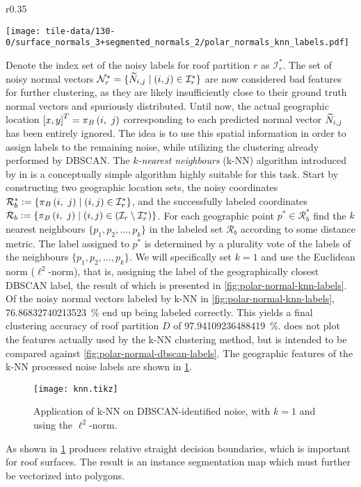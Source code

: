 \begin{wrapfigure}[16]{r}{0.35\textwidth}
  \begin{center}
    \texttt{[image: tile-data/130-0/surface\_normals\_3+segmented\_normals\_2/polar\_normals\_knn\_labels.pdf]}
  \end{center}
  \label{fig:polar-normal-knn-labels}
\end{wrapfigure}
Denote the index set of the noisy labels for roof partition $r$ as $\mathcal{I}_r^*$.
The set of noisy normal vectors $\mathcal{N}_r^* = \{\widetilde{N}_{i,j} \mid (i, j) \in \mathcal{I}_r^*\}$ are now considered bad features for further clustering, as they are likely insufficiently close to their ground truth normal vectors and spuriously distributed.
Until now, the actual geographic location ${[x, y]}^T = \pi_{B}\left(i,~j\right)$ corresponding to each predicted normal vector $\widetilde{N}_{i,j}$ has been entirely ignored.
The idea is to use this spatial information in order to assign labels to the remaining noise, while utilizing the clustering already performed by DBSCAN.
The \textit{$k$-nearest neighbours} (k-NN) algorithm introduced by \citeauthor{knn} in \citeyear{knn} \cite{knn} is a conceptually simple algorithm highly suitable for this task.
Start by constructing two geographic location sets, the noisy coordinates $\mathcal{R}_b^* \vcentcolon= \{\pi_{B}\left(i,~j\right) \mid (i, j) \in \mathcal{I}_r^* \}$, and the successfully labeled coordinates $\mathcal{R}_b \vcentcolon= \{\pi_{B}\left(i,~j\right) \mid (i, j) \in (\mathcal{I}_r \setminus \mathcal{I}_r^*)\}$.
For each geographic point $p^* \in \mathcal{R}_b^*$ find the $k$ nearest neighbours $\{p_1, p_2, \ldots, p_k\}$ in the labeled set $\mathcal{R}_b$ according to some distance metric.
The label assigned to $p^*$ is determined by a plurality vote of the labels of the neighbours $\{p_1, p_2, \ldots, p_k\}$.
We will specifically set $k = 1$ and use the Euclidean norm ($\ell^2$-norm), that is, assigning the label of the geographically closest DBSCAN label, the result of which is presented in \cref{fig:polar-normal-knn-labels}.
Of the noisy normal vectors labeled by k-NN in \cref{fig:polar-normal-knn-labels}, \SI[round-mode=places,round-precision=1]{76.86832740213523}{\percent} end up being labeled correctly.
This yields a final clustering accuracy of roof partition $D$ of \SI[round-mode=places,round-precision=1]{97.94109236488419}{\percent}.
 does not plot the features actually used by the k-NN clustering method, but is intended to be compared against \cref{fig:polar-normal-dbscan-labels}.
The geographic features of the k-NN processed noise labels are shown in \cref{fig:knn-tile}.
\begin{figure}[H]
  \centering
  \texttt{[image: knn.tikz]}
  \caption{Application of k-NN on DBSCAN-identified noise, with $k = 1$ and using the $\ell^2$-norm.}
  \label{fig:knn-tile}
\end{figure}
\noindent
As shown in \cref{fig:knn-tile} produces relative straight decision boundaries, which is important for roof surfaces.
The result is an instance segmentation map which must further be vectorized into polygons.
\newpage

